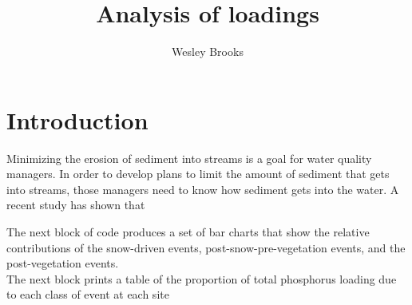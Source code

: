 \documentclass[12pt]{article}
\title{Analysis of loadings}
\author{Wesley Brooks}
\date{}                                           %
\begin{document}
\maketitle


\section{Introduction}
Minimizing the erosion of sediment into streams is a goal for water quality managers. In order to develop plans to limit the amount of sediment that gets into streams, those managers need to know how sediment gets into the water. A recent study \cite{Danz:2010} has shown that 

The next block of code produces a set of bar charts that show the relative contributions of the snow-driven events, post-snow-pre-vegetation events, and the post-vegetation events.\\











The next block prints a table of the proportion of total phosphorus loading due to each class of event at each site\\
\end{document}
